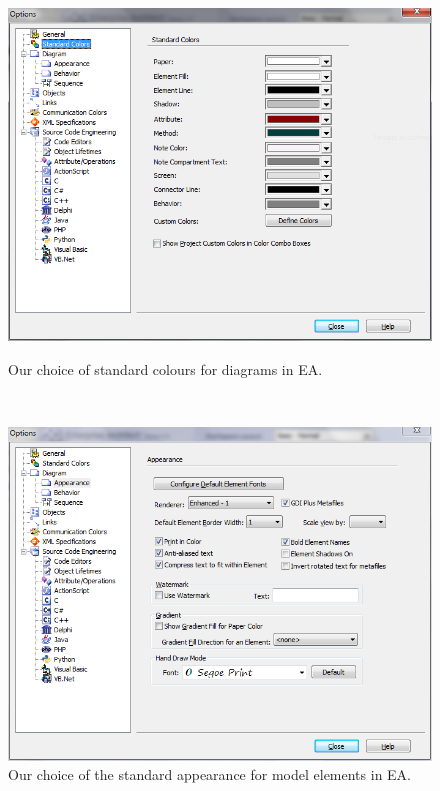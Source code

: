\begin{figure}[!h]
\centering
\begin{minipage}[b]{0.3\textheight}
  \centering
  \includegraphics[width=\textwidth]{pics/standardColours}
  \caption{Our choice of standard colours for diagrams in EA.}
  \label{fig_standardColoursEA}
\end{minipage}
\\
\vspace{0.5cm}
\begin{minipage}[b]{0.3\textheight}
  \centering
  \includegraphics[width=\textwidth]{pics/standardAppearance}
  \caption{Our choice of the standard appearance for model elements in EA.}

\end{minipage}
\end{figure}
